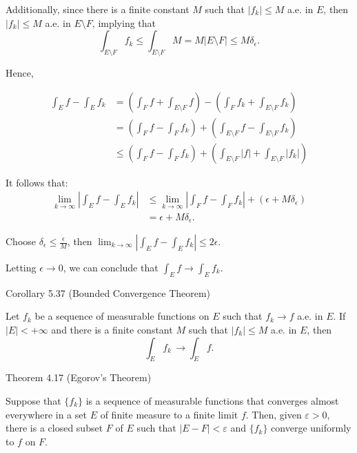 \documentclass[UTF8,a4paper,10pt]{article}
\begin{document}
Additionally, since there is a finite constant $M$ such that $|f_k| \leq M$ a.e. in $E$, then $|f_k| \leq M$ a.e. in $E\setminus F$, implying that
\[
  \int_{E\setminus F} f_k \leq \int_{E\setminus F} M = M |E\setminus F| \leq M\delta_{\epsilon}.
\]

Hence,

\begin{align*}
  \int_{E} f - \int_{E} f_k &= \left(\int_{F} f+\int_{E\setminus F} f\right) -  \left(\int_{F} f_k + \int_{E\setminus F} f_k\right)\\
  &= \left(\int_{F} f-\int_{F} f_k \right)+\left(\int_{E\setminus F} f- \int_{E\setminus F} f_k \right)\\
  &\leq \left(\int_{F} f-\int_{F} f_k \right)+\left(\int_{E\setminus F} |f| + \int_{E\setminus F} 
  |f_k|\right)
\end{align*}

It follows that:
\begin{align*}
  \lim_{k\to \infty}\left| \int_{E} f - \int_{E} f_k \right| 
  &\leq \lim_{k\to \infty}\left|\int_{F} f-\int_{F} f_k \right| +\left(\epsilon + M\delta_{\epsilon}\right)\\
  & = \epsilon + M\delta_{\epsilon}.
\end{align*}

Choose \(\delta_{\epsilon} \leq \frac{\epsilon}{M}\), then
\(\lim_{k\to \infty}\left| \int_{E} f - \int_{E} f_k \right| \leq 2\epsilon\). 

Letting \(\epsilon\to 0\), we can conclude that \(\int_{E} f \to \int_{E} f_k \).

\pagebreak

\begin{mybox}{Corollary 5.37 (Bounded Convergence Theorem)}

    Let $f_k$ be a sequence of measurable functions on $E$ such that $f_k \to f$ a.e. in $E$. If $|E| < +\infty$ and there is a finite constant $M$ such that $|f_k| \leq M$ a.e. in $E$, then
    \[
      \int_E f_k \,\to \int_E f .
    \]

\pagebreak

\end{mybox}

\begin{mybox}{Theorem 4.17 (Egorov's Theorem)}

  Suppose that $\{f_k\}$ is a sequence of measurable functions that converges almost everywhere in a set $E$ of finite measure to a finite limit $f$. Then, given $\varepsilon > 0$, there is a closed subset $F$ of $E$ such that $|E - F| < \varepsilon$ and $\{f_k\}$ converge uniformly to $f$ on $F$.

\end{mybox}
\end{document}
